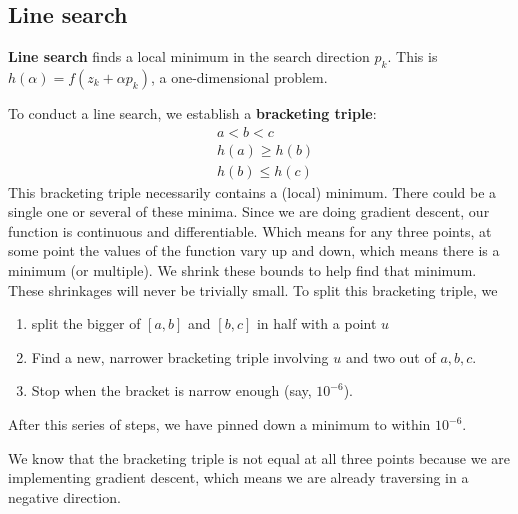 \documentclass[titlepage, 12pt, leqno]{article}
\begin{document}
\subsection{Line search}
\begin{definition}
    \textbf{Line search} finds a local minimum in the search direction $p_{k}$.
    This is $h(\alpha) = f(z_{k} + \alpha p_{k})$, a one-dimensional problem.
\end{definition}
To conduct a line search, we establish a \textbf{bracketing triple}:
\begin{align*}
    &a<b<c\\
    &h(a) \ge h(b)\\
    &h(b)\le h(c)
\end{align*}
This bracketing triple necessarily contains a (local) minimum. There could be a
single one or several of these minima. Since we are doing gradient descent, our
function is continuous and differentiable. Which means for any three points, at
some point the values of the function vary up and down, which means there is a
minimum (or multiple). We shrink these bounds to help find that minimum. These
shrinkages will never be trivially small. To split this bracketing triple, we

\begin{enumerate}
    \item split the bigger of $[a,b]$ and $[b,c]$ in half with a point $u$
    \item Find a new, narrower bracketing triple involving $u$ and two out of
        $a,b,c$.
    \item Stop when the bracket is narrow enough (say, $10^{-6}$).
\end{enumerate}

After this series of steps, we have pinned down a minimum to within $10^{-6}$.

\begin{note}
    We know that the bracketing triple is not equal at all three points because
    we are implementing gradient descent, which means we are already traversing
    in a negative direction.
\end{note}
\end{document}
